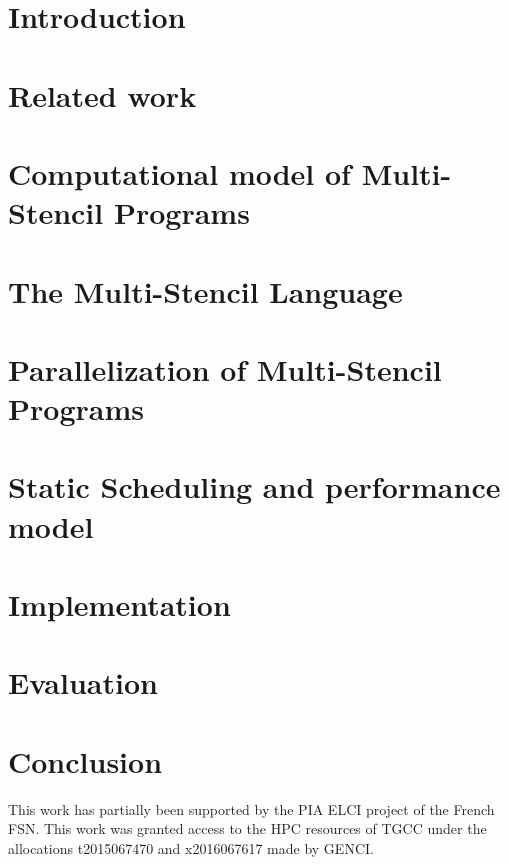 \documentclass[smallextended]{svjour3}       %
\begin{document}
\section{Introduction}
\label{sect:introduction}

\section{Related work}
\label{sect:rel}

\section{Computational model of Multi-Stencil Programs}
\label{sect:formalism}

\section{The Multi-Stencil Language}
\label{sect:msl}

\section{Parallelization of Multi-Stencil Programs}
\label{sect:parallelism}

\section{Static Scheduling and performance model}
\label{sect:msp}

\section{Implementation}
\label{sect:comp}

\section{Evaluation}
\label{sect:eval}

\section{Conclusion}
\label{sect:concl}


\begin{acknowledgements}
This work has partially been supported by the PIA ELCI project of the French FSN.
This  work  was  granted  access  to  the  HPC  resources  of TGCC under  the 
allocations t2015067470 and x2016067617 made by GENCI.
\end{acknowledgements}



\end{document}

